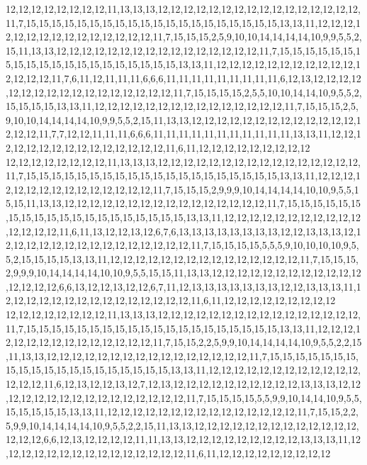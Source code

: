 12,12,12,12,12,12,12,12,11,13,13,13,12,12,12,12,12,12,12,12,12,12,12,12,12,12,12,12,11,7,15,15,15,15,15,15,15,15,15,15,15,15,15,15,15,15,15,15,15,15,13,13,11,12,12,12,12,12,12,12,12,12,12,12,12,12,12,12,11,7,15,15,15,2,5,9,10,10,14,14,14,14,10,9,9,5,5,2,15,11,13,13,12,12,12,12,12,12,12,12,12,12,12,12,12,12,12,12,11,7,15,15,15,15,15,15,15,15,15,15,15,15,15,15,15,15,15,15,15,15,13,13,11,12,12,12,12,12,12,12,12,12,12,12,12,12,12,12,11,7,6,11,12,11,11,11,6,6,6,11,11,11,11,11,11,11,11,11,6,12,13,12,12,12,12,12,12,12,12,12,12,12,12,12,12,12,12,12,11,7,15,15,15,15,2,5,5,10,10,14,14,10,9,5,5,2,15,15,15,15,13,13,11,12,12,12,12,12,12,12,12,12,12,12,12,12,12,12,11,7,15,15,15,2,5,9,10,10,14,14,14,14,10,9,9,5,5,2,15,11,13,13,12,12,12,12,12,12,12,12,12,12,12,12,12,12,12,12,11,7,7,12,12,11,11,11,6,6,6,11,11,11,11,11,11,11,11,11,11,11,13,13,11,12,12,12,12,12,12,12,12,12,12,12,12,12,12,12,11,6,11,12,12,12,12,12,12,12,12,12
12,12,12,12,12,12,12,12,11,13,13,13,12,12,12,12,12,12,12,12,12,12,12,12,12,12,12,12,11,7,15,15,15,15,15,15,15,15,15,15,15,15,15,15,15,15,15,15,15,15,13,13,11,12,12,12,12,12,12,12,12,12,12,12,12,12,12,12,11,7,15,15,15,2,9,9,9,10,14,14,14,14,10,10,9,5,5,15,15,11,13,13,12,12,12,12,12,12,12,12,12,12,12,12,12,12,12,12,11,7,15,15,15,15,15,15,15,15,15,15,15,15,15,15,15,15,15,15,15,15,13,13,11,12,12,12,12,12,12,12,12,12,12,12,12,12,12,12,11,6,11,13,12,12,13,12,6,7,6,13,13,13,13,13,13,13,13,12,12,13,13,13,12,12,12,12,12,12,12,12,12,12,12,12,12,12,12,12,11,7,15,15,15,15,5,5,5,9,10,10,10,10,9,5,5,2,15,15,15,15,13,13,11,12,12,12,12,12,12,12,12,12,12,12,12,12,12,12,11,7,15,15,15,2,9,9,9,10,14,14,14,14,10,10,9,5,5,15,15,11,13,13,12,12,12,12,12,12,12,12,12,12,12,12,12,12,12,12,6,6,13,12,12,13,12,12,6,7,11,12,13,13,13,13,13,13,13,12,12,13,13,13,11,12,12,12,12,12,12,12,12,12,12,12,12,12,12,12,11,6,11,12,12,12,12,12,12,12,12,12
12,12,12,12,12,12,12,12,11,13,13,13,12,12,12,12,12,12,12,12,12,12,12,12,12,12,12,12,11,7,15,15,15,15,15,15,15,15,15,15,15,15,15,15,15,15,15,15,15,15,13,13,11,12,12,12,12,12,12,12,12,12,12,12,12,12,12,12,11,7,15,15,2,2,5,9,9,10,14,14,14,14,10,9,5,5,2,2,15,11,13,13,12,12,12,12,12,12,12,12,12,12,12,12,12,12,12,12,11,7,15,15,15,15,15,15,15,15,15,15,15,15,15,15,15,15,15,15,15,15,13,13,11,12,12,12,12,12,12,12,12,12,12,12,12,12,12,12,11,6,12,13,12,12,13,12,7,12,13,12,12,12,12,12,12,12,12,12,12,13,13,13,12,12,12,12,12,12,12,12,12,12,12,12,12,12,12,12,11,7,15,15,15,15,5,5,9,9,10,14,14,10,9,5,5,15,15,15,15,15,13,13,11,12,12,12,12,12,12,12,12,12,12,12,12,12,12,12,11,7,15,15,2,2,5,9,9,10,14,14,14,14,10,9,5,5,2,2,15,11,13,13,12,12,12,12,12,12,12,12,12,12,12,12,12,12,12,12,6,6,12,13,12,12,12,12,11,11,13,13,12,12,12,12,12,12,12,12,12,13,13,13,11,12,12,12,12,12,12,12,12,12,12,12,12,12,12,12,11,6,11,12,12,12,12,12,12,12,12,12
